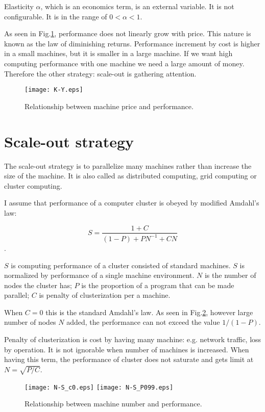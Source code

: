 \documentclass[a4paper,11pt]{article}
\begin{document}
Elasticity $\alpha$, which is an economics term, is an external variable.
It is not configurable. It is in the range of $0 < \alpha < 1$.

As seen in Fig.\ref{K-Y}, performance does not linearly grow with price.
This nature is known as the law of diminishing returns.
Performance increment by cost is higher in a small machines,
but it is smaller in a large machine.
If we want high computing performance with one machine we need a large amount of money.
Therefore the other strategy: scale-out is gathering attention.

\begin{figure}
\begin{center}
\texttt{[image: K-Y.eps]}
\caption{Relationship between machine price and performance.}
\label{K-Y}
\end{center}
\end{figure}

\section{Scale-out strategy}

The scale-out strategy is to parallelize many machines rather than increase the size of the machine. It is also called as distributed computing, grid computing or cluster computing.

I assume that performance of a computer cluster is obeyed by modified Amdahl's law:

$$
S = \frac{1 + C}{(1-P) + P N^{-1} + C N}
$$
. 

$S$ is computing performance of a cluster consisted of standard machines.
$S$ is normalized by performance of a single machine environment.
$N$ is the number of nodes the cluster has;
$P$ is the proportion of a program that can be made parallel;
$C$ is penalty of clusterization per a machine.

When $C=0$ this is the standard Amdahl's law. As seen in Fig.\ref{N-S}, however large number of nodes $N$ added, the performance can not exceed the value $1/(1-P)$.

Penalty of clusterization is cost by having many machine: e.g. network traffic, loss by operation. It is not ignorable when number of machines is increased.
When having this term, the performance of cluster does not saturate and gets limit at $N = \sqrt{P/C}$.

\begin{figure}
\begin{center}
\texttt{[image: N-S\_c0.eps]}
\texttt{[image: N-S\_P099.eps]}
\caption{Relationship between machine number and performance.}
\label{N-S}
\end{center}
\end{figure}
\end{document}
